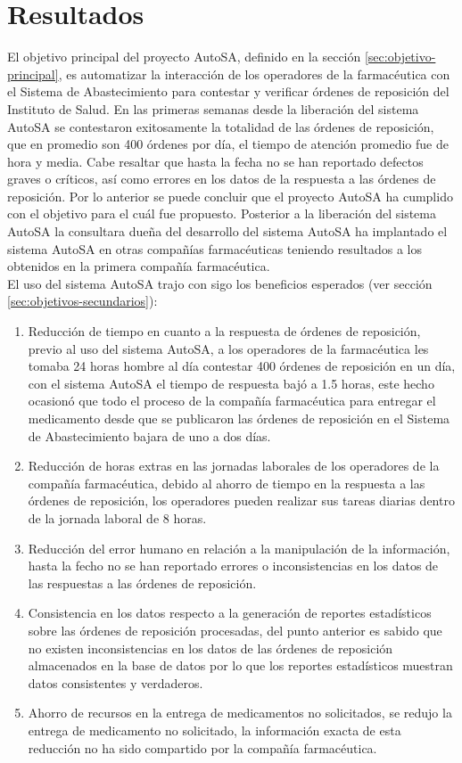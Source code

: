\section{Resultados}
El objetivo principal del proyecto AutoSA, definido en la sección \ref{sec:objetivo-principal}, es automatizar la interacción de los operadores de la farmacéutica con el Sistema de Abastecimiento para contestar y verificar órdenes de reposición del Instituto de Salud. En las primeras semanas desde la liberación del sistema AutoSA se contestaron exitosamente la totalidad de las órdenes de reposición, que en promedio son 400 órdenes por día, el tiempo de atención promedio fue de hora y media. Cabe resaltar que hasta la fecha no se han reportado defectos graves o críticos, así como errores en los datos de la respuesta a las órdenes de reposición. Por lo anterior se puede concluir que el proyecto AutoSA ha cumplido con el objetivo para el cuál fue propuesto. Posterior a la liberación del sistema AutoSA la consultara dueña del desarrollo del sistema AutoSA ha implantado el sistema AutoSA en otras compañías farmacéuticas teniendo resultados a los obtenidos en la primera compañía farmacéutica.\\

El uso del sistema AutoSA trajo con sigo los beneficios esperados (ver sección \ref{sec:objetivos-secundarios}):
\begin{enumerate}
	\item Reducción de tiempo en cuanto a la respuesta de órdenes de reposición, previo al uso del sistema AutoSA, a los operadores de la farmacéutica les tomaba 24 horas hombre al día contestar 400 órdenes de reposición en un día, con el sistema AutoSA el tiempo de respuesta bajó a 1.5 horas, este hecho ocasionó que todo el proceso de la compañía farmacéutica para entregar el medicamento desde que se publicaron las órdenes de reposición en el Sistema de Abastecimiento bajara de uno a dos días.
	\item Reducción de horas extras en las jornadas laborales de los operadores de la compañía farmacéutica, debido al ahorro de tiempo en la respuesta a las órdenes de reposición, los operadores pueden realizar sus tareas diarias dentro de la jornada laboral de 8 horas.
	\item Reducción del error humano en relación a la manipulación de la información, hasta la fecho no se han reportado errores o inconsistencias en los datos de las respuestas a las órdenes de reposición.
	\item Consistencia en los datos respecto a la generación de reportes estadísticos sobre las órdenes de reposición procesadas, del punto anterior es sabido que no existen inconsistencias en los datos de las órdenes de reposición almacenados en la base de datos por lo que los reportes estadísticos muestran datos consistentes y verdaderos.
	\item Ahorro de recursos en la entrega de medicamentos no solicitados, se redujo la entrega de medicamento no solicitado, la información exacta de esta reducción no ha sido compartido por la compañía farmacéutica.
\end{enumerate}


